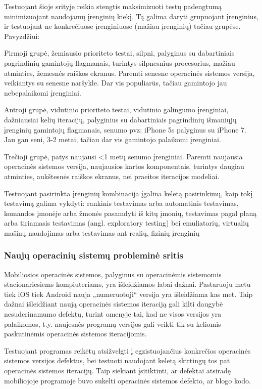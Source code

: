 \documentclass{VUMIFPSkursinis}
\begin{document}
Testuojant šioje srityje reikia stengtis maksimizuoti testų padengtumą minimizuojant naudojamų įrenginių kiekį. Tą galima daryti grupuojant įrenginius, ir testuojant ne konkrečiuose įrenginiuose (mažiau įrenginių) tačiau grupėse. Pavyzdžiui:

Pirmoji grupė, žemiausio prioriteto testai, silpni, palyginus su dabartiniais pagrindinių gamintojų flagmanais, turintys silpnesnius procesorius, mažiau atminties, žemesnės raiškos ekranus. Paremti senesne operacinės sistemos versija, veikiantys su senesne naršykle. Dar vis populiarūs, tačiau gamintojo jau nebepalaikomi įrenginiai.

Antroji grupė, vidutinio prioriteto testai, vidutinio galingumo įrenginiai, dažniausiai kelių iteracijų, palyginius su dabartiniais pagrindinių išmaniųjų įrenginių gamintojų flagmanais, senumo pvz: iPhone 5s palyginus su iPhone 7. Jau gan seni, 3-2 metai, tačiau dar vis gamintojo palaikomi įrenginiai.

Trečioji grupė, patys naujausi <1 metų senumo įrenginiai. Paremti naujausia operacinės sistemos versija, naujausios kartos komponentais, turintys daugiau atminties, aukštesnės raiškos ekranus, nei praeitos iteracijos modeliai.\cite{6496451}

Testuojant pasirinkta įrenginių kombinacija įgalina keletą pasirinkimų, kaip tokį testavimą galima vykdyti: rankinis testavimas arba automatinis testavimas, komandos įmonėje arba žmonės pasamdyti iš kitų įmonių, testavimas pagal planą arba tiriamasis testavimas (angl. exploratory testing) bei emuliatorių, virtualių mašinų naudojimas arba testavimas ant realių, fizinių įrenginių

\subsubsection{Naujų operacinių sistemų probleminė sritis}
Mobiliosios operacinės sistemos, palyginus su operacinėmis sistemomis stacionariesiems kompiuteriams, yra išleidžiamos labai dažnai. Pastaruoju metu tiek iOS tiek Android nauja „numeruotoji“ versija yra išleidžiama kas met. Taip dažnai išleidžiant naują operacinės sistemos iteraciją gali kilti daugybė nesuderinamumo defektų, turint omenyje tai, kad ne visos versijos yra palaikomos, t.y. naujesnės programų versijos gali veikti tik su keliomis paskutinėmis operacinės sistemos iteracijomis.

Testuojant programas reikėtų atsižvelgti į egzistuojančius konkrečios operacinės sistemos versijos defektus, bei testuoti naudojant keletą skirtingų tos pat operacinės sistemos iteracijų. Taip siekiant įsitiktinti, ar defektai atsiradę mobiliojoje programoje buvo sukelti operacinės sistemos defekto, ar blogo kodo.
\end{document}
